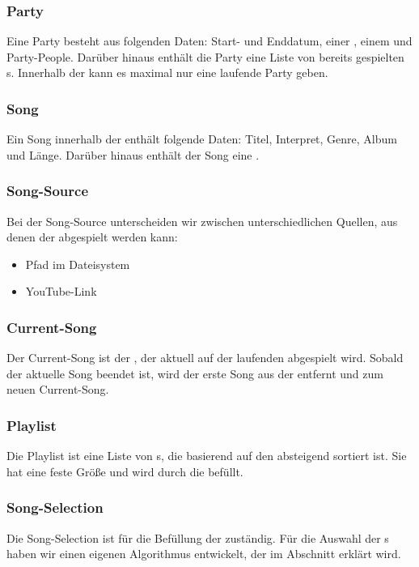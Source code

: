 \subsubsection{Party}
\label{sec:Party}
Eine Party besteht aus folgenden Daten: Start- und Enddatum, einer , einem  und Party-People. Darüber hinaus enthält die Party eine Liste von bereits gespielten s. Innerhalb der  kann es maximal nur eine laufende Party geben.

\subsubsection{Song}
\label{sec:Song}
Ein Song innerhalb der  enthält folgende Daten: Titel, Interpret, Genre, Album und Länge. Darüber hinaus enthält der Song eine .

\subsubsection{Song-Source}
\label{sec:SongSource}

Bei der Song-Source unterscheiden wir zwischen unterschiedlichen Quellen, aus denen der  abgespielt werden kann:
\begin{itemize}
	\item Pfad im Dateisystem 
	\item YouTube-Link
\end{itemize}

\subsubsection{Current-Song}
\label{sec:currentSong}
Der Current-Song ist der , der aktuell auf der laufenden  abgespielt wird. Sobald der aktuelle Song beendet ist, wird der erste Song aus der  entfernt und zum neuen Current-Song. 

\subsubsection{Playlist}
\label{sec:Playlist}
Die Playlist ist eine Liste von s, die basierend auf den  absteigend sortiert ist. Sie hat eine feste Größe und wird durch die  befüllt.

\subsubsection{Song-Selection}
\label{sec:songSelection}
Die Song-Selection ist für die Befüllung der  zuständig. Für die Auswahl der s haben wir einen eigenen Algorithmus entwickelt, der im Abschnitt  erklärt wird.

